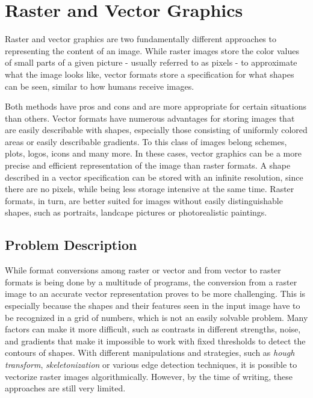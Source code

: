 \documentclass[12pt, a4paper, titlepage]{report}
\begin{document}
\section{Raster and Vector Graphics}

Raster and vector graphics are two fundamentally different approaches to representing the content of an image. While raster images store the color values of small parts of a given picture - usually referred to as pixels - to approximate what the image looks like, vector formats store a specification for what shapes can be seen, similar to how humans receive images.

Both methods have pros and cons and are more appropriate for certain situations than others.
Vector formats have numerous advantages for storing images that are easily describable with shapes, especially those consisting of uniformly colored areas or easily describable gradients. To this class of images belong schemes, plots, logos, icons and many more. In these cases, vector graphics can be a more precise and efficient representation of the image than raster formats. A shape described in a vector specification can be stored with an infinite resolution, since there are no pixels, while being less storage intensive at the same time. Raster formats, in turn, are better suited for images without easily distinguishable shapes, such as portraits, landcape pictures or photorealistic paintings.

\subsection{Problem Description}

While format conversions among raster or vector and from vector to raster formats is being done by a multitude of programs, the conversion from a raster image to an accurate vector representation proves to be more challenging. This is especially because the shapes and their features seen in the input image have to be recognized in a grid of numbers, which is not an easily solvable problem. Many factors can make it more difficult, such as contrasts in different strengths, noise, and gradients that make it impossible to work with fixed thresholds to detect the contours of shapes. With different manipulations and strategies, such as \emph{hough transform}, \emph{skeletonization} or various edge detection techniques, it is possible to vectorize raster images algorithmically. However, by the time of writing, these approaches are still very limited.
\end{document}
